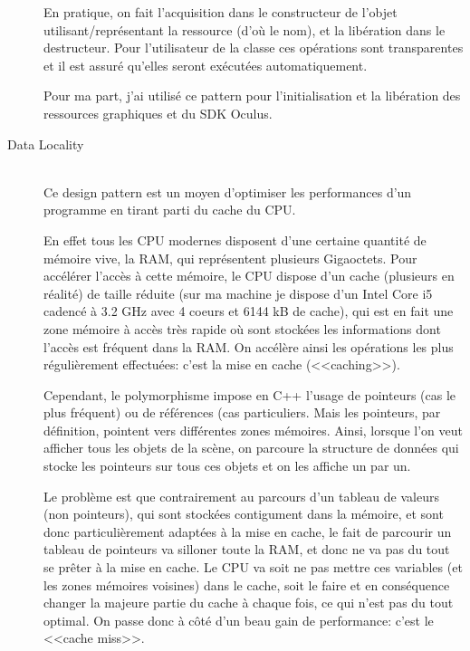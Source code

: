 \documentclass[a4paper,french,12pt]{article}
\begin{document}
\begin{description}
	      En pratique, on fait l'acquisition dans le constructeur de l'objet utilisant/représentant la ressource (d'où le nom), et 
	      la libération dans le destructeur. Pour l'utilisateur de la classe ces opérations sont transparentes et il est
	      assuré qu'elles seront exécutées automatiquement.
	      
	      
	      Pour ma part, j'ai utilisé ce pattern pour l'initialisation et la libération des ressources graphiques et
	      du SDK Oculus.
	    
	    \item [Data Locality]~\\
	      Ce design pattern est un moyen d'optimiser les performances d'un programme en tirant parti du cache du CPU.
	      
	      En effet tous les CPU modernes disposent d'une certaine quantité de mémoire vive, la RAM, qui représentent
	      plusieurs Gigaoctets. Pour accélérer l'accès à cette mémoire, le CPU dispose d'un cache (plusieurs en réalité)
	      de taille réduite (sur ma machine je dispose d'un Intel Core i5 cadencé à 3.2 GHz avec 4 coeurs et 6144 kB
	      de cache), qui est en fait une zone mémoire à accès très rapide où sont stockées les informations dont l'accès est fréquent
	      dans la RAM. On accélère ainsi les opérations les plus régulièrement effectuées: c'est la mise en cache (<<caching>>).
	      
	      Cependant, le polymorphisme impose en C++ l'usage de pointeurs (cas le plus fréquent) ou de références (cas particuliers. 
	      Mais les pointeurs, par définition, pointent vers différentes zones mémoires.
	      Ainsi, lorsque l'on veut afficher tous les objets de la scène, on parcoure la structure de données qui
	      stocke les pointeurs sur tous ces objets et on les affiche un par un.
	      
	      Le problème est que contrairement au parcours d'un tableau de valeurs (non pointeurs), qui sont stockées
	      contigument dans la mémoire, et sont donc particulièrement adaptées à la mise en cache, le fait de
	      parcourir un tableau de pointeurs va silloner toute la RAM, et donc ne va pas du tout se prêter à la mise
	      en cache. Le CPU va soit ne pas mettre ces variables (et les zones mémoires voisines) dans le cache, soit le faire
	      et en conséquence changer la majeure partie du cache à chaque fois, ce qui n'est pas du tout optimal.
	      On passe donc à côté d'un beau gain de performance: c'est le <<cache miss>>.
	      

\end{description}
\end{document}
